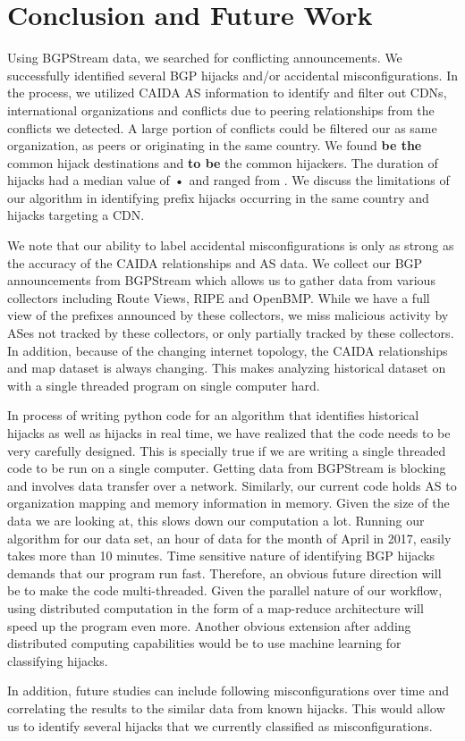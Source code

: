 \section{Conclusion and Future Work}

Using BGPStream data, we searched for conflicting announcements. We successfully identified several BGP hijacks and/or accidental misconfigurations. In the process, we utilized CAIDA AS information to identify and filter out CDNs, international organizations and conflicts due to peering relationships from the conflicts we detected. A large portion of conflicts could be filtered our as same organization, as peers or originating in the same country. We found \textbf{be the} common hijack destinations and \textbf{to be} the common hijackers. The duration of hijacks had a median value of \textbf{•} and ranged from . We discuss the limitations of our algorithm in identifying prefix hijacks occurring in the same country and hijacks targeting a CDN. 

We note that our ability to label accidental misconfigurations is only as strong as the accuracy of the CAIDA relationships and AS data. We collect  our BGP announcements from BGPStream which allows us to gather data from various collectors including Route Views, RIPE and OpenBMP. While we have a full view of the prefixes announced by these collectors, we miss malicious activity by ASes not tracked by these collectors, or only partially tracked by these collectors. In addition, because of the changing internet topology, the CAIDA relationships and map dataset is always changing. This makes analyzing historical dataset on with a single threaded program on single computer hard. 

In process of writing python code for an algorithm that identifies historical hijacks as well as hijacks in real time, we have realized that the code needs to be very carefully designed. This is specially true if we are writing a single threaded code to be run on a single computer. Getting data from BGPStream is blocking and involves data transfer over a network. Similarly, our current code holds AS to organization mapping and memory information in memory. Given the size of the data we are looking at, this slows down our computation a lot. Running our algorithm for our data set, an hour of data for the month of April in 2017, easily takes more than 10 minutes. Time sensitive nature of identifying BGP hijacks demands that our program run fast. Therefore, an obvious future direction will be to make the code multi-threaded. Given the parallel nature of our workflow, using distributed computation in the form of a map-reduce architecture will speed up the program even more. Another obvious extension after adding distributed computing capabilities would be to use machine learning for classifying hijacks.

In addition, future studies can include following misconfigurations over time and correlating the results to the similar data from known hijacks. This would allow us to identify several hijacks that we currently classified as misconfigurations. 

